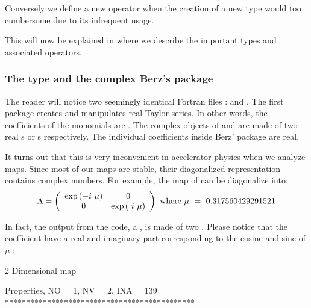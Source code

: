 \documentclass[english,12pt,article]{article} %
\begin{document}
{Conversely we define a new operator when the creation of a new type would too cumbersome due to its infrequent usage.

This will now be explained in  where  we describe  the important types and associated operators.



  \subsubsection{The type {} and the complex Berz's package }\label{sec:cdamap}
  
  The reader will notice two seemingly identical Fortran files :  and  . The first package creates and manipulates real Taylor series. In other words, the coefficients of the monomials are . 
  The complex objects of  and   are made of two real  s  or  s  respectively. The individual coefficients inside Berz' package  are real.
  
  It turns out that this is very inconvenient in accelerator physics  when we analyze maps. Since most of our maps are stable, their diagonalized representation contains complex numbers. For example, the map  of  can be diagonalize 
  into:
%
\begin{align} \Lambda =
\left({\begin{array}{cc}\exp\left({-i\ \mu }\right)&0\\
0&\exp\left({\ i\ \mu }\right)\end{array}}\right)~{\rm w}{\rm h}{\rm e}{\rm r}{\rm e}~\mu \ =
\ 0.317560429291521 \label{eq:lam}\end{align}

In fact, the output  from the code, a ,   is made of two . Please notice that the coefficient have a real and imaginary part  corresponding to the cosine and sine of $\mu$ :

\begin{example}
           2  Dimensional map

 Properties, NO =    1, NV =    2, INA =  139
 *********************************************


\end{example}}
\end{document}
